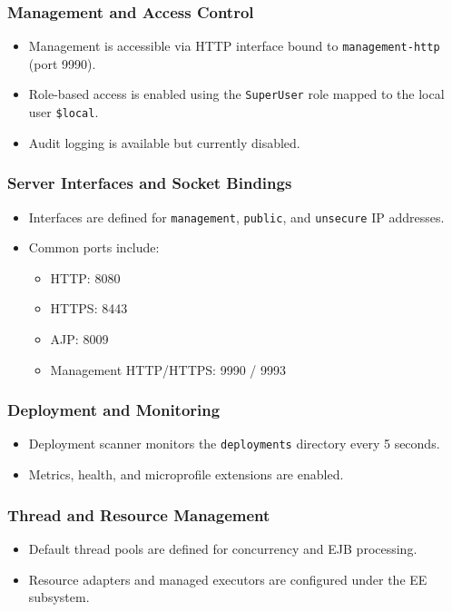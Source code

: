 \documentclass[12pt]{article}
\begin{document}
\subsubsection{Management and Access Control}
\begin{itemize}
	\item Management is accessible via HTTP interface bound to \texttt{management-http} (port 9990).
	\item Role-based access is enabled using the \texttt{SuperUser} role mapped to the local user \texttt{\$local}.
	\item Audit logging is available but currently disabled.
\end{itemize}


\subsubsection{Server Interfaces and Socket Bindings}
\begin{itemize}
	\item Interfaces are defined for \texttt{management}, \texttt{public}, and \texttt{unsecure} IP addresses.
	\item Common ports include:
	      \begin{itemize}
		      \item HTTP: 8080
		      \item HTTPS: 8443
		      \item AJP: 8009
		      \item Management HTTP/HTTPS: 9990 / 9993
	      \end{itemize}
\end{itemize}

\subsubsection{Deployment and Monitoring}
\begin{itemize}
	\item Deployment scanner monitors the \texttt{deployments} directory every 5 seconds.
	\item Metrics, health, and microprofile extensions are enabled.
\end{itemize}

\subsubsection{Thread and Resource Management}
\begin{itemize}
	\item Default thread pools are defined for concurrency and EJB processing.
	\item Resource adapters and managed executors are configured under the EE subsystem.
\end{itemize}
\end{document}
